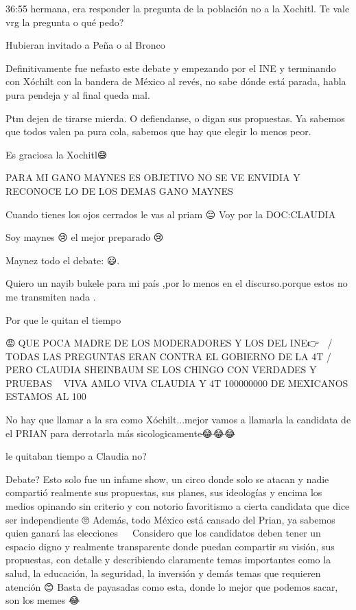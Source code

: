 36:55 hermana, era responder la pregunta de la población no a la Xochitl. Te vale vrg la pregunta o qué pedo?

Hubieran invitado a Peña o al Bronco

Definitivamente fue nefasto este debate y empezando por el INE y terminando con Xóchilt con la bandera de México al revés, no sabe dónde está parada, habla pura pendeja y al final queda mal.

Ptm dejen de tirarse mierda. O defiendanse, o digan sus propuestas. Ya sabemos que todos valen pa pura cola, sabemos que hay que elegir lo menos peor.

Es graciosa la Xochitl😅

PARA MI GANO MAYNES ES OBJETIVO NO SE VE ENVIDIA Y RECONOCE LO DE LOS DEMAS GANO MAYNES

Cuando tienes los ojos cerrados le vas al priam 😔
Voy por la DOC:CLAUDIA

Soy maynes 😢 el mejor preparado 😢

Maynez todo el debate: 😃.

Quiero un nayib bukele para mi país ,por lo menos en el discurso.porque estos no me transmiten nada .

Por que le quitan el tiempo

😡🤬QUE POCA MADRE DE LOS MODERADORES Y LOS DEL INE👉🐀💩 / TODAS LAS PREGUNTAS ERAN CONTRA EL GOBIERNO DE LA 4T / PERO CLAUDIA SHEINBAUM  SE LOS CHINGO CON VERDADES Y PRUEBAS 👏👏  VIVA AMLO VIVA CLAUDIA Y 4T 100000000 DE MEXICANOS ESTAMOS AL 100%

No  hay que llamar a la sra como Xóchilt...mejor vamos a llamarla la candidata de el PRIAN para derrotarla más sicologicamente😂😂😂

le quitaban tiempo a Claudia no?

Debate? Esto solo fue un infame show, un circo donde solo se atacan y nadie compartió realmente sus propuestas, sus planes, sus ideologías y encima los medios opinando sin criterio y con notorio favoritismo a cierta candidata que dice ser independiente 🙄 
Además, todo México está cansado del Prian, ya sabemos quien ganará las elecciones 🤷🏽‍♂️
Considero que los candidatos deben tener un espacio digno y realmente transparente donde puedan compartir su visión, sus propuestas, con detalle y describiendo claramente temas importantes como la salud, la educación, la seguridad, la inversión y demás temas que requieren atención 😊
Basta de payasadas como esta, donde lo mejor que podemos sacar, son los memes 😂

